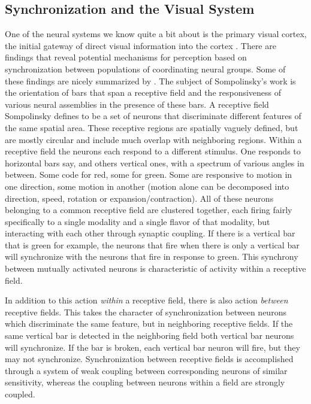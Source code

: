 \documentclass[12pt]{article}
\begin{document}
\subsection{Synchronization and the Visual System}

One of the neural systems we know quite a bit about is the primary visual cortex, the initial gateway of direct visual information into the cortex \cite{Tanaka}.  There are findings that reveal potential mechanisms for perception based on synchronization between populations of coordinating neural groups.  Some of these findings are nicely summarized by \cite{Sompolinsky}.  The subject of Sompolinsky's work is the orientation of bars that span a receptive field and the responsiveness of various neural assemblies in the presence of these bars.  A receptive field Sompolinsky defines to be a set of neurons that discriminate different features of the same spatial area.  These receptive regions are spatially vaguely defined, but are mostly circular and include much overlap with neighboring regions.  Within a receptive field the neurons each respond to a different stimulus.  One responds to horizontal bars say, and others vertical ones, with a spectrum of various angles in between.  Some code for red, some for green.  Some are responsive to motion in one direction, some motion in another (motion alone can be decomposed into direction, speed, rotation or expansion/contraction).  All of these neurons belonging to a common receptive field are clustered together, each firing fairly specifically to a single modality and a single flavor of that modality, but interacting with each other through synaptic coupling.  If there is a vertical bar that is green for example, the neurons that fire when there is only a vertical bar will synchronize with the neurons that fire in response to green.  This synchrony between mutually activated neurons is characteristic of activity within a receptive field.  

In addition to this action {\em within} a receptive field, there is also action {\em between} receptive fields.  This takes the character of synchronization between neurons which discriminate the same feature, but in neighboring receptive fields.  If the same vertical bar is detected in the neighboring field both vertical bar neurons will synchronize.  If the bar is broken, each vertical bar neuron will fire, but they may not synchronize.  Synchronization between receptive fields is accomplished through a system of weak coupling between corresponding neurons of similar sensitivity, whereas the coupling between neurons within a field are strongly coupled.  
\end{document}
